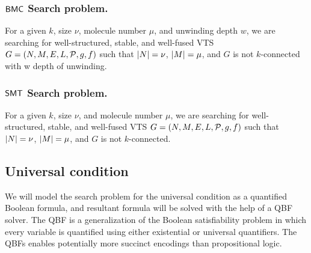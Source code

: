 \subsubsection{$\mathsf{BMC}$ Search problem.}
For a given $k$, size $\nu$, molecule number $\mu$, and unwinding depth $w$,
we are searching for well-structured, stable, and well-fused VTS
$G = (N,M,E,L,\mathcal{P},g,f)$ such that
$|N| = \nu$, $|M| = \mu$, and $G$ is not $k$-connected with w depth of unwinding.    

\subsubsection{$\mathsf{SMT}$ Search problem.}
For a given $k$, size $\nu$, and molecule number $\mu$,
we are searching for well-structured, stable, and well-fused VTS
$G = (N,M,E,L,\mathcal{P},g,f)$ such that
$|N| = \nu$, $|M| = \mu$, and
$G$ is not $k$-connected.    

%
%
%
%

\subsection{Universal condition}
We will model the search problem for the universal condition as a quantified Boolean formula, and resultant formula will be solved with the help of a QBF solver.
%
The QBF is a generalization of the Boolean satisfiability problem in which every variable is quantified using either existential or universal quantifiers.
%
The QBFs enables potentially more succinct encodings than propositional logic.
 
